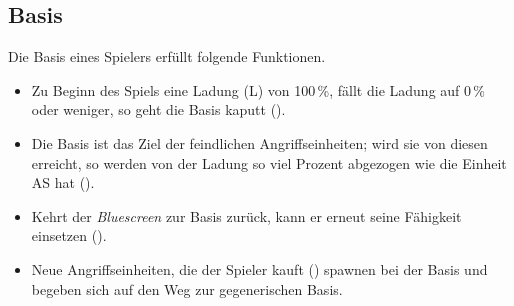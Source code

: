 \subsection{Basis}

Die Basis eines Spielers erfüllt folgende Funktionen.

\begin{itemize}
  \item Zu Beginn des Spiels eine Ladung (L) von 100\,\%, fällt die Ladung auf
    0\,\% oder weniger, so geht die Basis kaputt ().

  \item Die Basis ist das Ziel der feindlichen Angriffseinheiten; wird sie von
    diesen erreicht, so werden von der Ladung so viel Prozent abgezogen wie die
    Einheit AS hat ().

  \item Kehrt der \emph{Bluescreen} zur Basis zurück, kann er erneut seine
    Fähigkeit einsetzen ().

  \item Neue Angriffseinheiten, die der Spieler kauft ()
    spawnen bei der Basis und begeben sich auf den Weg zur gegenerischen Basis.

\end{itemize}
